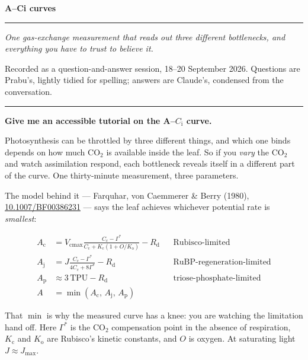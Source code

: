 \documentclass[11pt,letterpaper]{article}
\newcommand{\Vcmax}{\ensuremath{V_{\mathrm{cmax}}}}
\newcommand{\Jmax}{\ensuremath{J_{\mathrm{max}}}}
\newcommand{\Rd}{\ensuremath{R_{\mathrm{d}}}}
\newcommand{\Ci}{\ensuremath{C_{\mathrm{i}}}}
\newcommand{\Cc}{\ensuremath{C_{\mathrm{c}}}}
\newcommand{\Gs}{\ensuremath{\Gamma^{*}}}
\newcommand{\question}[1]{%
  \vspace{1.5em}%
  {\noindent\color{rulegray}\rule{\textwidth}{0.4pt}\par}%
  \vspace{0.7em}%
  {\noindent\color{accent}\bfseries #1\par}%
  \vspace{0.6em}%
}
\begin{document}
{\noindent\color{titledark}\LARGE\bfseries A--C\lowercase{i} curves\par}
\vspace{0.4em}
{\noindent\color{rulegray}\rule{\textwidth}{0.8pt}\par}
\vspace{0.5em}
{\noindent\color{muted}\itshape One gas-exchange measurement that reads out three
different bottlenecks, and everything you have to trust to believe it.\par}
\vspace{1.2em}

{\noindent\color{muted}\small Recorded as a question-and-answer session, 18--20
September 2026. Questions are Prabu's, lightly tidied for spelling; answers are
Claude's, condensed from the conversation.\par}

\question{Give me an accessible tutorial on the A--\Ci{} curve.}

Photosynthesis can be throttled by three different things, and which one binds
depends on how much CO$_2$ is available inside the leaf. So if you \emph{vary}
the CO$_2$ and watch assimilation respond, each bottleneck reveals itself in a
different part of the curve. One thirty-minute measurement, three parameters.

The model behind it --- Farquhar, von Caemmerer \& Berry (1980),
\href{https://doi.org/10.1007/BF00386231}{10.1007/BF00386231} --- says the leaf
achieves whichever potential rate is \emph{smallest}:

\begin{align*}
A_{\mathrm{c}} &= \Vcmax \frac{\Cc - \Gs}{\Cc + K_{\mathrm{c}}(1 + O/K_{\mathrm{o}})} - \Rd
   &&\text{Rubisco-limited}\\[0.2em]
A_{\mathrm{j}} &= J \frac{\Cc - \Gs}{4\Cc + 8\Gs} - \Rd
   &&\text{RuBP-regeneration-limited}\\[0.2em]
A_{\mathrm{p}} &\approx 3\,\mathrm{TPU} - \Rd
   &&\text{triose-phosphate-limited}\\[0.4em]
A &= \min(A_{\mathrm{c}},\, A_{\mathrm{j}},\, A_{\mathrm{p}})
\end{align*}

That $\min$ is why the measured curve has a knee: you are watching the
limitation hand off. Here \Gs{} is the CO$_2$ compensation point in the absence
of respiration, $K_{\mathrm{c}}$ and $K_{\mathrm{o}}$ are Rubisco's kinetic
constants, and $O$ is oxygen. At saturating light $J \approx \Jmax$.
\end{document}
